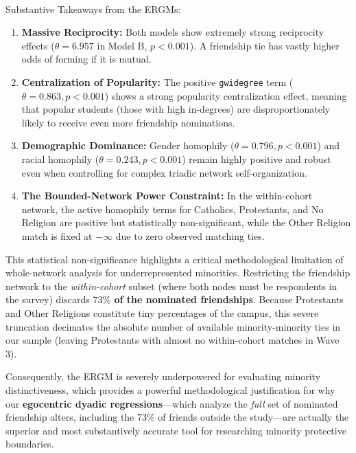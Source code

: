 \documentclass[
  letterpaper,
  DIV=11,
  numbers=noendperiod]{scrartcl}
\makeatletter
\let\oldparagraph\paragraph
\renewcommand{\paragraph}{
    \@ifstar
      \xxxParagraphStar
      \xxxParagraphNoStar
  }
\newcommand{\xxxParagraphStar}[1]{\oldparagraph*{#1}\mbox{}}
\newcommand{\xxxParagraphNoStar}[1]{\oldparagraph{#1}\mbox{}}
\providecommand{\tightlist}{%
  \setlength{\itemsep}{0pt}\setlength{\parskip}{0pt}}
\makeatother
\begin{document}
\paragraph{Substantive Takeaways from the
ERGMs:}\label{substantive-takeaways-from-the-ergms}

\begin{enumerate}
\def\labelenumi{\arabic{enumi}.}
\tightlist
\item
  \textbf{Massive Reciprocity:} Both models show extremely strong
  reciprocity effects (\(\theta = 6.957\) in Model B, \(p < 0.001\)). A
  friendship tie has vastly higher odds of forming if it is mutual.
\item
  \textbf{Centralization of Popularity:} The positive \texttt{gwidegree}
  term (\(\theta = 0.863, p < 0.001\)) shows a strong popularity
  centralization effect, meaning that popular students (those with high
  in-degrees) are disproportionately likely to receive even more
  friendship nominations.
\item
  \textbf{Demographic Dominance:} Gender homophily
  (\(\theta = 0.796, p < 0.001\)) and racial homophily
  (\(\theta = 0.243, p < 0.001\)) remain highly positive and robust even
  when controlling for complex triadic network self-organization.
\item
  \textbf{The Bounded-Network Power Constraint:} In the within-cohort
  network, the active homophily terms for Catholics, Protestants, and No
  Religion are positive but statistically non-significant, while the
  Other Religion match is fixed at \(-\infty\) due to zero observed
  matching ties.
\end{enumerate}

This statistical non-significance highlights a critical methodological
limitation of whole-network analysis for underrepresented minorities.
Restricting the friendship network to the \emph{within-cohort} subset
(where both nodes must be respondents in the survey) discards
\textbf{\(73\%\) of the nominated friendships}. Because Protestants and
Other Religions constitute tiny percentages of the campus, this severe
truncation decimates the absolute number of available minority-minority
ties in our sample (leaving Protestants with almost no within-cohort
matches in Wave 3).

Consequently, the ERGM is severely underpowered for evaluating minority
distinctiveness, which provides a powerful methodological justification
for why our \textbf{egocentric dyadic regressions}---which analyze the
\emph{full} set of nominated friendship alters, including the \(73\%\)
of friends outside the study---are actually the superior and most
substantively accurate tool for researching minority protective
boundaries.
\end{document}
